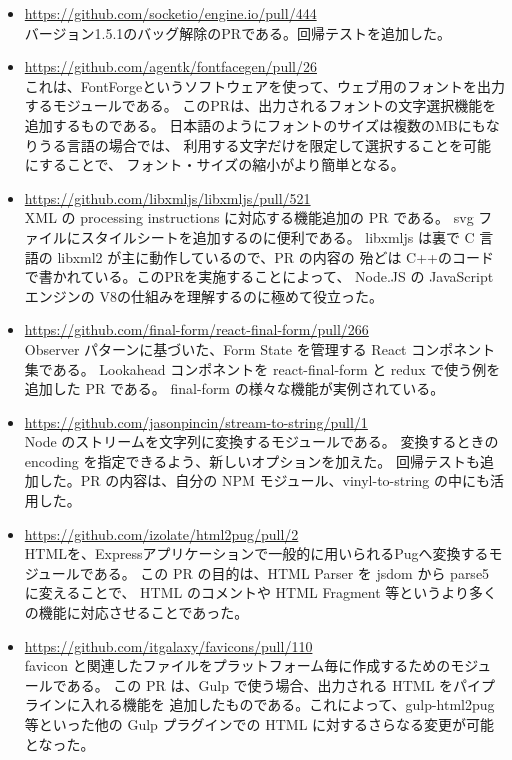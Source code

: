 \documentclass{res}
\begin{document}
\begin{resume}
\begin{itemize}
  \item \url{https://github.com/socketio/engine.io/pull/444} \\
  バージョン1.5.1のバッグ解除のPRである。回帰テストを追加した。

  \item \url{https://github.com/agentk/fontfacegen/pull/26} \\
  これは、FontForgeというソフトウェアを使って、ウェブ用のフォントを出力するモジュールである。
  このPRは、出力されるフォントの文字選択機能を追加するものである。
  日本語のようにフォントのサイズは複数のMBにもなりうる言語の場合では、
  利用する文字だけを限定して選択することを可能にすることで、
  フォント・サイズの縮小がより簡単となる。

  \item \url{https://github.com/libxmljs/libxmljs/pull/521} \\
  XML の processing instructions に対応する機能追加の PR である。
  svg ファイルにスタイルシートを追加するのに便利である。
  libxmljs は裏で C 言語の libxml2 が主に動作しているので、PR の内容の
  殆どは C++のコードで書かれている。このPRを実施することによって、
  Node.JS の JavaScript エンジンの V8の仕組みを理解するのに極めて役立った。

  \item \url{https://github.com/final-form/react-final-form/pull/266} \\
  Observer パターンに基づいた、Form State を管理する React コンポネント集である。
  Lookahead コンポネントを react-final-form と redux で使う例を追加した PR である。
  final-form の様々な機能が実例されている。

  \item \url{https://github.com/jasonpincin/stream-to-string/pull/1} \\
  Node のストリームを文字列に変換するモジュールである。
  変換するときの encoding を指定できるよう、新しいオプションを加えた。
  回帰テストも追加した。PR の内容は、自分の NPM モジュール、vinyl-to-string
  の中にも活用した。

  \item \url{https://github.com/izolate/html2pug/pull/2} \\
  HTMLを、Expressアプリケーションで一般的に用いられるPugへ変換するモジュールである。
  この PR の目的は、HTML Parser を jsdom から parse5 に変えることで、
  HTML のコメントや HTML Fragment 等というより多くの機能に対応させることであった。

  \item \url{https://github.com/itgalaxy/favicons/pull/110} \\
  favicon と関連したファイルをプラットフォーム毎に作成するためのモジュールである。
  この PR は、Gulp で使う場合、出力される HTML をパイプラインに入れる機能を
  追加したものである。これによって、gulp-html2pug等といった他の
  Gulp プラグインでの HTML に対するさらなる変更が可能となった。


\end{itemize}
\end{resume}
\end{document}
